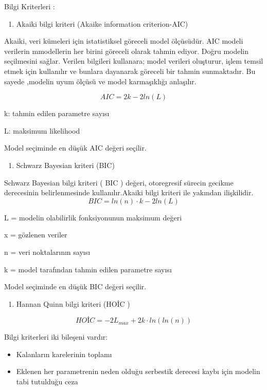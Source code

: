 \documentclass[11pt]{article}
\providecommand{\tightlist}{%
      \setlength{\itemsep}{0pt}\setlength{\parskip}{0pt}}
\begin{document}
Bilgi Kriterleri :

\begin{enumerate}
\def\labelenumi{\arabic{enumi}.}
\tightlist
\item
  Akaiki bilgi kriteri (Akaike information criterion-AIC)
\end{enumerate}

Akaiki, veri kümeleri için istatistiksel göreceli model ölçüsüdür. AIC
modeli verilerin mmodellerin her birini göreceli olarak tahmin ediyor.
Doğru modelin seçilmesini sağlar. Verilen bilgileri kullanara; model
verileri oluşturur, işlem temsil etmek için kullanılır ve bunlara
dayanarak göreceli bir tahmin sunmaktadır. Bu sayede ,modelin uyum
ölçüsü ve model karmaşıklığı anlaşılır.

\[ AIC = 2k - 2ln(L) \]

k: tahmin edilen parametre sayısı

L: maksimum likelihood

Model seçiminde en düşük AIC değeri seçilir.

\begin{enumerate}
\def\labelenumi{\arabic{enumi}.}
\setcounter{enumi}{1}
\tightlist
\item
  Schwarz Bayesian kriteri (BIC)
\end{enumerate}

Schwarz Bayesian bilgi kriteri ( BIC ) değeri, otoregresif sürecin
gecikme derecesinin belirlenmesinde kullanılır.Akaiki bilgi kriteri ile
yakından ilişkilidir. \[ BIC = ln(n)\cdot k - 2ln(L) \]

L = modelin olabilirlik fonksiyonunun maksimum değeri

x = gözlenen veriler

n = veri noktalarının sayısı

k = model tarafından tahmin edilen parametre sayısı

Model seçiminde en düşük BIC değeri seçilir.

\begin{enumerate}
\def\labelenumi{\arabic{enumi}.}
\setcounter{enumi}{2}
\tightlist
\item
  Hannan Quinn bilgi kriteri (HOİC )
\end{enumerate}

\[ HOİC= -2L_{max} + 2k\cdot ln(ln(n)) \]

Bilgi kriterleri iki bileşeni vardır:

\begin{itemize}
\tightlist
\item
  Kalanların karelerinin toplamı
\item
  Eklenen her parametrenin neden olduğu serbestik derecesi kaybı için
  modelin tabi tutulduğu ceza
\end{itemize}
\end{document}
